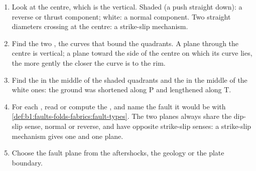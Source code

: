 \begin{method}\label{met:b1:earthquake-source:beachball}
\begin{enumerate}
  \item Look at the centre, which is the vertical. Shaded (a push straight
        down): a reverse or thrust component; white: a normal component. Two
        straight diameters crossing at the centre: a strike-slip mechanism.
  \item Find the two , the curves that bound the quadrants. A
        plane through the centre is vertical; a plane  toward the side of
        the centre on which its curve lies, the more gently the closer the curve
        is to the rim.
  \item Find the  in the middle of the shaded quadrants and the  in
        the middle of the white ones: the ground was shortened along P and
        lengthened along T.
  \item For each , read or compute the , and name the fault it
        would be with \cref{def:b1:faults-folds-fabrics:fault-types}. The two
        planes always share the dip-slip sense, normal or reverse, and have
        opposite strike-slip senses: a strike-slip mechanism gives one 
        and one  plane.
  \item Choose the fault plane from the aftershocks, the geology or the plate
        boundary.
\end{enumerate}
\end{method}


